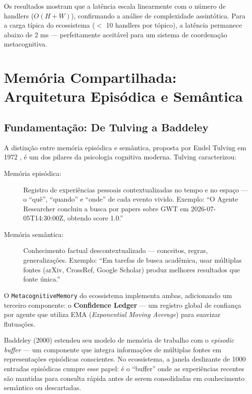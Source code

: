 Os resultados mostram que a latência escala linearmente com o número de handlers ($O(H+W)$), confirmando a análise de complexidade assintótica. Para a carga típica do ecossistema ($<$ 10 handlers por tópico), a latência permanece abaixo de 2 ms — perfeitamente aceitável para um sistema de coordenação metacognitiva.


\section{Memória Compartilhada: Arquitetura Episódica e Semântica}
\label{sec:memoria}

\subsection{Fundamentação: De Tulving a Baddeley}

A distinção entre memória episódica e semântica, proposta por Endel Tulving em 1972 \cite{Tulving1972_Episodic}, é um dos pilares da psicologia cognitiva moderna. Tulving caracterizou:

\begin{description}
    \item[Memória episódica:] Registro de experiências pessoais contextualizadas no tempo e no espaço — o ``quê'', ``quando'' e ``onde'' de cada evento vivido. Exemplo: ``O Agente Researcher concluiu a busca por papers sobre GWT em 2026-07-05T14:30:00Z, obtendo score 1.0.''
    
    \item[Memória semântica:] Conhecimento factual descontextualizado — conceitos, regras, generalizações. Exemplo: ``Em tarefas de busca acadêmica, usar múltiplas fontes (arXiv, CrossRef, Google Scholar) produz melhores resultados que fonte única.''
\end{description}

O \texttt{MetacognitiveMemory} do ecossistema implementa ambas, adicionando um terceiro componente: o \textbf{Confidence Ledger} — um registro global de confiança por agente que utiliza EMA (\textit{Exponential Moving Average}) para suavizar flutuações.

Baddeley (2000) \cite{Baddeley2000_EpisodicBuffer} estendeu seu modelo de memória de trabalho com o \textit{episodic buffer} — um componente que integra informações de múltiplas fontes em representações episódicas conscientes. No ecossistema, a janela deslizante de 1000 entradas episódicas cumpre esse papel: é o ``buffer'' onde as experiências recentes são mantidas para consulta rápida antes de serem consolidadas em conhecimento semântico ou descartadas.

